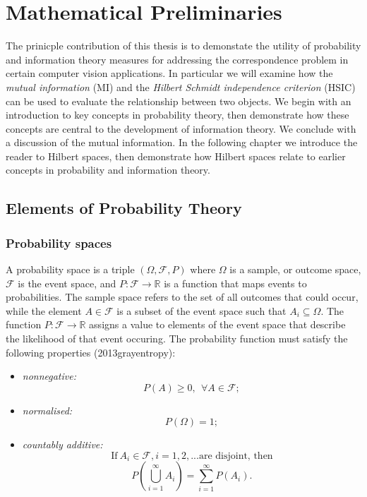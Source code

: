 \chapter{Mathematical Preliminaries}
\label{mathbasics}


The prinicple contribution of this thesis is to demonstate the utility of probability and information theory measures for addressing the correspondence problem in certain computer vision applications. In particular we will examine how the \textit{mutual information} (MI) and the \textit{Hilbert Schmidt independence criterion} (HSIC) can be used to evaluate the relationship between two objects. We begin with an introduction to key concepts in probability theory, then demonstrate how these concepts are central to the development of information theory. We conclude with a discussion of the mutual information. In the following chapter we introduce the reader to Hilbert spaces, then demonstrate how Hilbert spaces relate to earlier concepts in probability and information theory. 

\section{Elements of Probability Theory}

\subsection{Probability spaces}

A probability space is a triple $(\Omega, \mathcal{F}, P)$ where $\Omega$ is a sample, or outcome space, $\mathcal{F}$ is the event space, and $P : \mathcal{F} \rightarrow \mathbb{R}$ is a function that maps events to probabilities. The sample space refers to the set of all outcomes that could occur, while the element $A \in \mathcal{F}$ is a subset of the event space such that $A_i \subseteq \Omega$. The function $P : \mathcal{F} \rightarrow \mathbb{R}$ assigns a value to elements of the event space that describe the likelihood of that event occuring. The probability function must satisfy the following properties (2013grayentropy):

\begin{itemize}
	\item \textit{nonnegative:} 
		\begin{equation}
			P(A) \geq 0, \:\: \forall A \in \mathcal{F};
		\end{equation}
	\item \textit{normalised:} 
		\begin{equation}
			P(\Omega) = 1;
		\end{equation}
	\item \textit{countably additive:} 
		$$\text{If} \: A_i \in \mathcal{F}, i = 1, 2, ... \text{are disjoint, then}$$
		\begin{equation}
			P(\bigcup_{i=1}^{\infty} A_i) = \sum_{i=1}^{\infty}{P(A_i)}.
		\end{equation}
\end{itemize}

